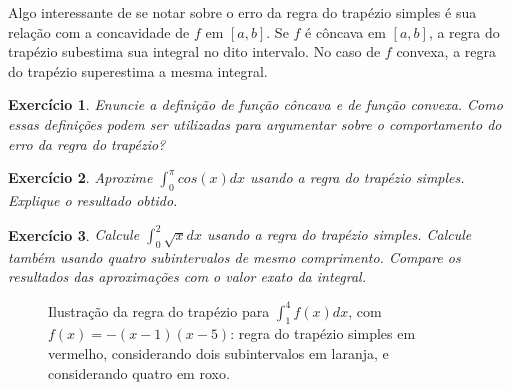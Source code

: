 \documentclass[]{article}
\newtheorem{exercicio}{Exercício}
\numberwithin{equation}{section}
\begin{document}
Algo interessante de se notar sobre o erro da regra do trapézio simples é sua relação com a concavidade de $f$ em $[a, b]$. Se $f$ é côncava em $[a, b]$, a regra do trapézio subestima sua integral no dito intervalo. No caso de $f$ convexa, a regra do trapézio superestima a mesma integral.

\begin{exercicio}
	Enuncie a definição de função côncava e de função convexa. Como essas definições podem ser utilizadas para argumentar sobre o comportamento do erro da regra do trapézio?
\end{exercicio}

\begin{exercicio}
	Aproxime $\int_{0}^{\pi} cos(x) dx$ usando a regra do trapézio simples. Explique o resultado obtido.
\end{exercicio}

\begin{exercicio}
	Calcule $\int_{0}^{2}\sqrt{x}dx$ usando a regra do trapézio simples. Calcule também usando quatro subintervalos de mesmo comprimento. Compare os resultados das aproximações com o valor exato da integral.
\end{exercicio}

\begin{figure}
  \centering
  \caption{Ilustração da regra do trapézio para $\int_1^4 f(x)dx$, com
    $f(x) = -(x - 1)(x - 5)$: regra do trapézio simples em vermelho,
    considerando dois subintervalos em laranja, e considerando quatro
    em roxo.}
  
\end{figure}
\end{document}
